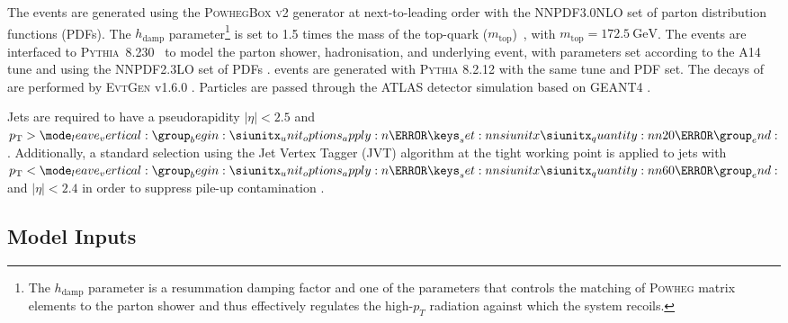 \newcommand{\hdampFootnote}{%
The $h_\text{damp}$ parameter is a resummation damping factor and one of the parameters that controls the matching of \textsc{Powheg} matrix elements to the parton shower and thus effectively regulates the high-$p_T$ radiation against which the \ttbar system recoils.}

The \ttbar events are generated using the \textsc{PowhegBox} \cite{powheg2004, powheg2007, powheg2007_2, powheg2010} \textsc{v2} generator at next-to-leading order with the NNPDF3.0NLO \cite{Ball:2014uwa} set of parton distribution functions (PDFs). The $h_\text{damp}$ parameter\footnote{\hdampFootnote} is set to 1.5 times the mass of the top-quark ($m_\text{top}$)~\cite{ATL-PHYS-PUB-2016-020}, with $m_\text{top} = \SI{172.5}{\GeV}$. 
The events are interfaced to \textsc{Pythia}~8.230~\cite{Sjostrand:2014zea} to model the parton shower, hadronisation, and underlying event, with parameters set according to the A14 tune \cite{ATL-PHYS-PUB-2014-021} and using the NNPDF2.3LO set of PDFs \cite{Ball:2012cx}. 
\Zprime events are generated with \textsc{Pythia} 8.2.12 with the same tune and PDF set.
The decays of \bchadrons are performed by \textsc{EvtGen} v1.6.0 \cite{Lange:2001uf}.
Particles are passed through the ATLAS detector simulation \cite{SOFT-2010-01} based on GEANT4 \cite{Agostinelli:2002hh}.

Jets are required to have a pseudorapidity $|\eta| < 2.5$ and $\pt > \SI{20}{\GeV}$.
Additionally, a standard selection using the Jet Vertex Tagger (JVT) algorithm at the tight working point is applied to jets with $\pt < \SI{60}{\GeV}$ and $|\eta| < 2.4$ in order to suppress pile-up contamination \cite{ATLAS-CONF-2014-018}.


\subsection{Model Inputs}\label{sec:fake_mva_model_inputs}



